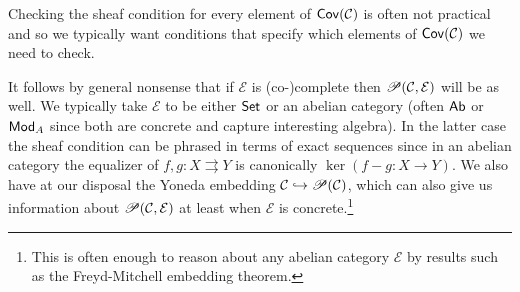 \documentclass[11pt]{article}
\newcommand{\CC}{\mathcal{C}}
\newcommand{\EE}{\mathcal{E}}
\begin{document}
\begin{remark}
Checking the sheaf condition for every element of $\Cov(\CC)$ is often not practical and so we typically want conditions that specify which elements of $\Cov(\CC)$ we need to check.
\end{remark}

It follows by general nonsense that if $\EE$ is (co-)complete then $\Pre(\CC,\EE)$ will be as well. We typically take $\EE$ to be either $\operatorname{\mathsf{Set}}$ or an abelian category (often $\operatorname{\mathsf{Ab}}$ or $\operatorname{\mathsf{Mod}}_A$ since both are concrete and capture interesting algebra). In the latter case the sheaf condition can be phrased in terms of exact sequences since in an abelian category the equalizer of $f,g: X\rightrightarrows Y$ is canonically $\ker(f-g: X\to Y)$. We also have at our disposal the Yoneda embedding $\CC\inj\Pre(\CC)$, which can also give us information about $\Pre(\CC,\EE)$ at least when $\EE$ is concrete.\footnote{This is often enough to reason about any abelian category $\EE$ by results such as the Freyd-Mitchell embedding theorem.}
\end{document}
